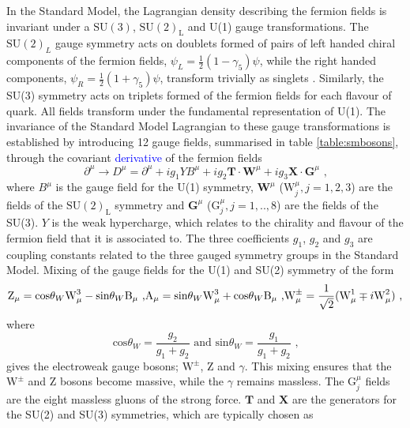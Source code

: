 In the Standard Model, the Lagrangian density describing the fermion fields is invariant under a $\text{SU}(3)$, $\text{SU}(2)_{\text{L}}$ and U(1) gauge transformations.  The $\text{SU}(2)_{L}$ gauge symmetry acts on doublets formed of pairs of left handed chiral components of the fermion fields, $\psi_{L} = \frac{1}{2}(1-\gamma_{5})\psi$, while the right handed components, $\psi_{R} = \frac{1}{2}(1+\gamma_{5})\psi$, transform trivially as singlets \cite{Weinberg:1967tq}.  Similarly, the SU(3) symmetry acts on triplets formed of the fermion fields for each flavour of quark.  All fields transform under the fundamental representation of U(1).  The invariance of the Standard Model Lagrangian to these gauge transformations is established by introducing 12 gauge fields, summarised in table \ref{table:smbosons}, through the covariant \textcolor{blue}{derivative} of the fermion fields
%
\begin{equation}
\partial^{\mu} \rightarrow D^{\mu} = \partial^{\mu} + ig_{1}YB^{\mu} + ig_{2} \textbf{T} \cdot \textbf{W}^{\mu} + ig_{3}\textbf{X} \cdot \textbf{G}^{\mu} \text{ ,}
\end{equation}
%
\noindent where $B^{\mu}$ is the gauge field for the U(1) symmetry, $\textbf{W}^{\mu}$ ($\text{W}^{\mu}_{j}, j =1,2,3$) are the fields of the $\text{SU}(2)_{\text{L}}$ symmetry and $\textbf{G}^{\mu}$ ($\text{G}^{\mu}_{j}, j =1,..,8$) are the fields of the SU(3).  $Y$ is the weak hypercharge, which relates to the chirality and flavour of the fermion field that it is associated to.  The three coefficients $g_{1}$, $g_{2}$ and $g_{3}$ are coupling constants related to the three gauged symmetry groups in the Standard Model.  Mixing of the gauge fields for the U(1) and SU(2) symmetry of the form
%
\begin{equation}
\text{Z}_{\mu} = \text{cos}{\theta_{W}} \text{W}^{3}_{\mu} - \text{sin}{\theta_{W}} \text{B}_{\mu} \text{ ,}\\
\text{A}_{\mu} = \text{sin}{\theta_{W}} \text{W}^{3}_{\mu} + \text{cos}{\theta_{W}} \text{B}_{\mu} \text{ ,}\\
\text{W}^{\pm}_{\mu} = \frac{1}{\sqrt{2}}(\text{W}^{1}_{\mu} \mp i \text{W}^{2}_{\mu}) \text{ ,}
\end{equation}
%
\noindent where
%
\begin{equation}
\text{cos}{\theta_{W}} = \frac{g_{2}}{g_{1}+g_{2}} \text{ and } \text{sin}{\theta_{W}} = \frac{g_{1}}{g_{1}+g_{2}} \text{ ,}
\end{equation}
%
\noindent gives the electroweak gauge bosons; $\text{W}^{\pm}$, Z and $\gamma$.  This mixing ensures that the $\text{W}^{\pm}$ and Z bosons become massive, while the $\gamma$ remains massless.  The $\text{G}^{\mu}_{j}$ fields are the eight massless gluons of the strong force.   $\textbf{T}$ and $\textbf{X}$ are the generators for the SU(2) and SU(3) symmetries, which are typically chosen as

